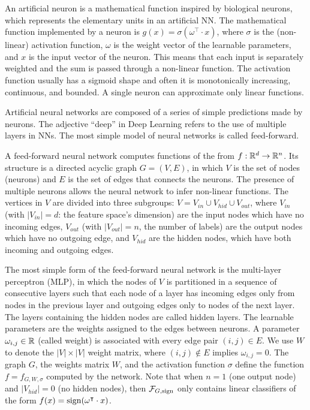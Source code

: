 \begin{definition}[Neuron]
	An artificial neuron is a mathematical function inspired by biological neurons, which represents the elementary units in an artificial NN. The mathematical function implemented by a neuron is $g(x) = \sigma(\omega^\intercal \cdot x)$, where $\sigma$ is the (non-linear) activation function, $\omega$ is the weight vector of the learnable parameters, and $x$ is the input vector of the neuron. This means that each input is separately weighted and the sum is passed through a non-linear function. The activation function usually has a sigmoid shape and often it is monotonically increasing, continuous, and bounded. A single neuron can approximate only linear functions.	
\end{definition}

Artificial neural networks are composed of a series of simple predictions made by neurons. The adjective ``deep'' in Deep Learning refers to the use of multiple layers in NNs. The most simple model of neural networks is called feed-forward. 

\begin{definition}
	A feed-forward neural network computes functions of the from $f : \mathbb{R}^d \to \mathbb{R}^n$. Its structure is a directed acyclic graph $G = (V, E)$, in which $V$ is the set of nodes (neurons) and $E$ is the set of edges that connects the neurons. The presence of multiple neurons allows the neural network to infer non-linear functions. The vertices in $V$ are divided into three subgroups: $V = V_{in} \cup V_{hid} \cup V_{out}$, where $V_{in}$ (with $|V_{in}| = d$:	 the feature space's dimension) are the input nodes which have no incoming edges, $V_{out}$ (with $|V_{out}| = n$, the number of labels) are the output nodes which have no outgoing edge, and $V_{hid}$ are the hidden nodes, which have both incoming and outgoing edges.
\end{definition}

The most simple form of the feed-forward neural network is the multi-layer perceptron (MLP), in which the nodes of $V$ is partitioned in a sequence of consecutive layers such that each node of a layer has incoming edges only from
nodes in the previous layer and outgoing edges only to nodes of the next layer.  The layers containing the hidden nodes are called hidden layers. The learnable parameters are the weights assigned to the edges between neurons. 
A parameter $\omega_{i,j} \in \mathbb{R}$ (called weight) is associated with every edge pair $(i, j) \in E$.  We use $W$ to denote the $|V | \times |V |$ weight matrix, where $(i, j) \notin E$ implies $\omega_{i,j} = 0$. The graph $G$, the weights matrix
$W$, and the activation function $\sigma$ define the function $f = f_{G,W,\sigma}$ computed by the network.  Note that when $n = 1$ (one output node) and $|V_{hid}| = 0$ (no hidden nodes), then $\mathcal{F}_{G,\operatorname{sign}}$ only contains linear classifiers of the form $f(x) = \operatorname{sign}(\omega^\intercal \cdot x)$. 


